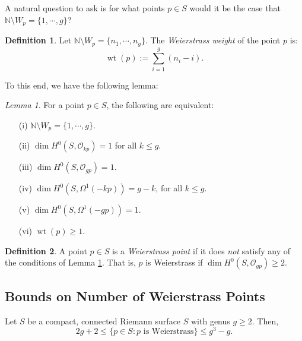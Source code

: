\documentclass[a4paper]{report}
\theoremstyle{definition}
\newtheorem{definition}{Definition}
\theoremstyle{remark}
\theoremstyle{proposition}
\theoremstyle{conjecture}
\theoremstyle{lemma}
\newtheorem{lemma}{Lemma}
\theoremstyle{corollary}
\theoremstyle{exercise}
\theoremstyle{example}
\newcommand{\mcal}{\mathcal}
\newcommand{\on}{\operatorname}
\begin{document}
A natural question to ask is for what points $p\in S$ 
would it be the case that
$\mathbb{N}\setminus W_p = \lbrace 1,\cdots,g\rbrace$?
\begin{definition}
    Let $\mathbb{N}\setminus W_p = \lbrace n_1,\cdots,n_g\rbrace$.
    The \emph{Weierstrass weight} of the point $p$ is:
    $$\on{wt}(p) := \sum_{i=1}^g(n_i-i).$$
\end{definition}
To this end, we have the following lemma:

\begin{lemma}\label{lem13}
    For a point $p\in S$, the following are equivalent:
    \begin{itemize}
        \item[(i)] $\mathbb{N}\setminus W_p = \lbrace 1,\cdots,g\rbrace$.
        \item[(ii)] $\dim H^0(S,\mcal{O}_{kp})=1$ for all $k\leq g$.
        \item[(iii)] $\dim H^0(S,\mcal{O}_{gp}) = 1$.
        \item[(iv)] $\dim H^0(S,\Omega^1(-kp)) = g-k$, for all $k\leq g$.
        \item[(v)] $\dim H^0(S,\Omega^1(-gp)) = 1$.
        \item[(vi)] $\on{wt}(p) \geq 1$.
    \end{itemize}
\end{lemma}

\begin{definition}
    A point $p\in S$ is a \emph{Weierstrass point} if it does \emph{not}
    satisfy any of the conditions of Lemma \ref{lem13}.
    That is, $p$ is Weierstrass if $\dim H^0(S,\mcal{O}_{gp}) \geq 2$.
\end{definition}

\subsection{Bounds on Number of Weierstrass Points}

\begin{theorem}
    Let $S$ be a compact, connected Riemann surface $S$ with genus $g\geq 2$.
    Then,
    $$2g + 2 \leq \lbrace p\in S : \text{$p$ is Weierstrass}\rbrace \leq g^3-g.$$
\end{theorem}
\end{document}
